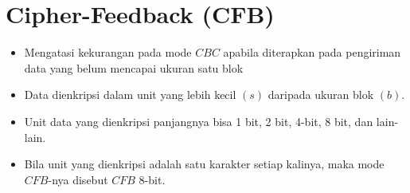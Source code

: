 \documentclass{article}
\begin{document}

\section*{Cipher-Feedback (CFB)}

\begin{itemize}
    \item Mengatasi kekurangan pada mode $CBC$ apabila diterapkan pada pengiriman data yang belum mencapai ukuran satu blok
    \item Data dienkripsi dalam unit yang lebih kecil $(s)$ daripada ukuran blok $(b)$.
    \item Unit data yang dienkripsi panjangnya bisa 1 bit, 2 bit, 4-bit, 8 bit, dan lain-lain.
    \item Bila unit yang dienkripsi adalah satu karakter setiap kalinya, maka mode $CFB$-nya disebut $CFB$ 8-bit.
\end{itemize}
\end{document}
